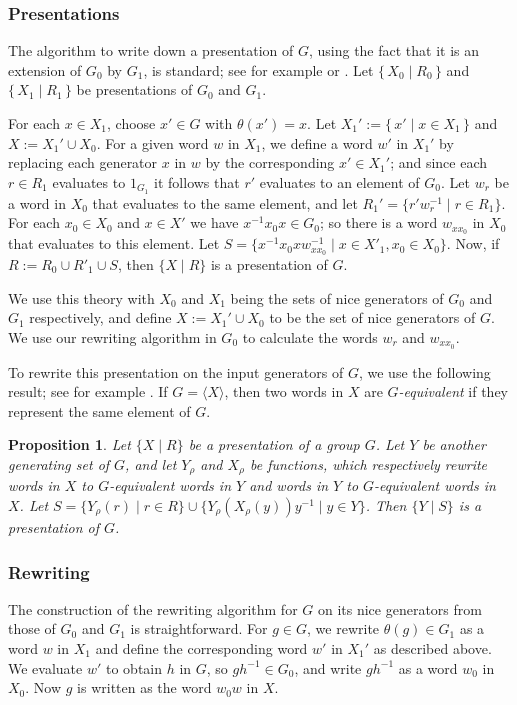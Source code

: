 \documentclass[12pt,twoside,reqno,psamsfonts]{amsproc}
\numberwithin{equation}{section}
\numberwithin{figure}{section}
\newcounter{algorithm}
\theoremstyle{plain}
\newtheorem{pr}[thm]{Proposition}
\theoremstyle{definition}
\theoremstyle{remark}
\begin{document}
\subsubsection{Presentations} 
\label{pres}
The algorithm to write down a presentation of $G$, using the fact that it
is an extension of $G_0$ by $G_1$, is standard; see
for example \cite[Proposition 2.55]{hcgt} or \cite[\S 10.2]{joh90}. 
Let $\{\, X_0 \mid R_0\, \}$ and
$\{\, X_1 \mid R_1\, \}$ be presentations of $G_0$ and $G_1$.

For each $x\in X_1$, choose $x' \in G$ with $\theta(x') = x$.
Let $X_1' := \{\, x' \mid x \in X_1\,\}$ and $X := X_1' \cup X_0$.
For a given word $w$ in $X_1$, we define a word $w'$ in $X_1'$  by
replacing each generator $x$ in $w$ by the corresponding $x' \in X_1'$; and
since each $r \in R_1$ evaluates to $1_{G_1}$ it follows that $r'$ evaluates to
an element of $G_0$.  Let $w_r$ be a word in $X_0$ that evaluates
to the same element, and let $R_1'=\{r'w^{-1}_r\mid r\in R_1\}$.
For each $x_0\in X_0$ and $x\in X'$ we have $x^{-1}x_0x\in G_0$;
so there is a word $w_{xx_0}$ in $X_0$ that evaluates to this element.
Let $S=\{x^{-1}x_0xw_{xx_0}^{-1}\mid x\in X'_1,x_0\in X_0\}$.
Now, if $R:=R_0\cup R'_1\cup S$, then $\{X\mid R\}$ is a presentation of $G$.

We use this theory with $X_0$ and $X_1$ being the sets of nice
generators of $G_0$ and $G_1$ respectively, and define $X := X_1' \cup X_0$
to be the set of nice generators of $G$. We use our rewriting algorithm
in $G_0$ to calculate the words $w_r$ and $w_{xx_0}$.

To rewrite this presentation on the input generators of $G$, 
we use the following result; see for example
\cite[\S 4.4, Remark 7]{joh90}.
If $G = \langle X \rangle$, then two words in $X$ are 
{\em $G$-equivalent} if they represent the same element of $G$.

\begin{pr}\label{changegens}
Let $\{ X \mid R \}$ be a presentation of a group $G$.
Let $Y$ be another generating set of $G$, and let $Y_\rho$ and $X_\rho$ be
functions, which respectively rewrite words in $X$ to $G$-equivalent words
in $Y$ and words in $Y$ to $G$-equivalent words in $X$.
Let $S = \{ Y_\rho(r)\mid r \in R \} \cup
\{ Y_\rho(X_\rho(y))y^{-1} \mid y \in Y \}$.
Then $\{ Y \mid S \}$ is a presentation of $G$.
\end{pr}

\subsubsection{Rewriting}\label{rewriting} 
The construction of the rewriting algorithm for $G$ on its nice generators
from those of $G_0$ and $G_1$ is straightforward.
For $g \in G$, we rewrite $\theta(g) \in G_1$ as a word $w$ in $X_1$
and define the corresponding word $w'$ in $X_1'$ as described above.
We evaluate $w'$ to obtain $h$ in $G$, so $gh^{-1} \in G_0$, and write
$gh^{-1}$ as a word $w_0$ in $X_0$.  Now $g$ is written as the
word $w_0w$ in $X$.
\end{document}
